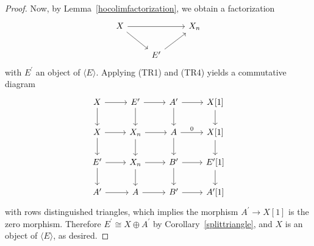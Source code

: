 \documentclass[dissertation.tex]{subfiles}
\begin{document}
\begin{prop}
\begin{proof}
    Now, by Lemma~\ref{hocolimfactorization}, we obtain a factorization
    $$\begin{tikzcd}
      X \arrow{rr}\arrow{rd} & & X_n\\
      & E^\prime \arrow{ur}
    \end{tikzcd}$$
    with $E^\prime$ an object of $\langle E \rangle$.
    Applying (TR1) and (TR4) yields a commutative diagram
    $$\begin{tikzcd}
      X \arrow{d}\arrow{r} & E^\prime \arrow{r}\arrow{d} & A^\prime \arrow{r}\arrow{d} & X[1]\arrow{d}\\
      X \arrow{r}\arrow{d} & X_n \arrow{r}\arrow{d} & A \arrow{r}{0}\arrow{d} & X[1]\arrow{d}\\
      E^\prime \arrow{r}\arrow{d} & X_n \arrow{r}\arrow{d} & B^\prime \arrow{r}\arrow{d} & E^\prime[1]\arrow{d}\\
      A^\prime \arrow{r} & A \arrow{r} & B^\prime \arrow{r} & A^\prime[1]
    \end{tikzcd}$$
    with rows distinguished triangles, which implies the morphism $A^\prime \rightarrow X[1]$ is the zero morphism.
    Therefore $E^\prime \cong X \oplus A^\prime$ by Corollary~\ref{splittriangle}, and $X$ is an object of $\langle E \rangle$, as desired.
  \end{proof}
\end{prop}
\end{document}
